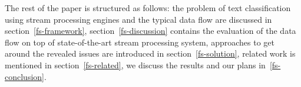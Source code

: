 The rest of the paper is structured as follows: the problem of text classification using stream processing engines and the typical data flow are discussed in section~\ref{fs-framework}, section~\ref{fs-discussion} contains the evaluation of the data flow on top of state-of-the-art stream processing system, approaches to get around the revealed issues are introduced in section~\ref{fs-solution}, related work is mentioned in section~\ref{fs-related}, we discuss the results and our plans in~\ref{fs-conclusion}.
